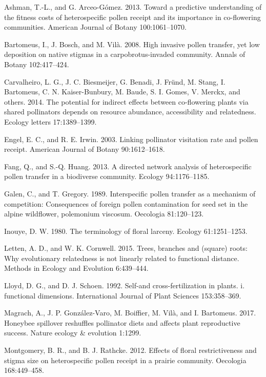 \documentclass[11pt,a4paper]{article}
\begin{document}
\hypertarget{ref-ashman2013}{}
Ashman, T.-L., and G. Arceo-Gómez. 2013. Toward a predictive
understanding of the fitness costs of heterospecific pollen receipt and
its importance in co-flowering communities. American Journal of Botany
100:1061--1070.

\hypertarget{ref-bartomeus2008}{}
Bartomeus, I., J. Bosch, and M. Vilà. 2008. High invasive pollen
transfer, yet low deposition on native stigmas in a carpobrotus-invaded
community. Annals of Botany 102:417--424.

\hypertarget{ref-carvalheiro2014}{}
Carvalheiro, L. G., J. C. Biesmeijer, G. Benadi, J. Fründ, M. Stang, I.
Bartomeus, C. N. Kaiser-Bunbury, M. Baude, S. I. Gomes, V. Merckx, and
others. 2014. The potential for indirect effects between co-flowering
plants via shared pollinators depends on resource abundance,
accessibility and relatedness. Ecology letters 17:1389--1399.

\hypertarget{ref-engel2003}{}
Engel, E. C., and R. E. Irwin. 2003. Linking pollinator visitation rate
and pollen receipt. American Journal of Botany 90:1612--1618.

\hypertarget{ref-fang2013}{}
Fang, Q., and S.-Q. Huang. 2013. A directed network analysis of
heterospecific pollen transfer in a biodiverse community. Ecology
94:1176--1185.

\hypertarget{ref-galen1989}{}
Galen, C., and T. Gregory. 1989. Interspecific pollen transfer as a
mechanism of competition: Consequences of foreign pollen contamination
for seed set in the alpine wildflower, polemonium viscosum. Oecologia
81:120--123.

\hypertarget{ref-inouye1980}{}
Inouye, D. W. 1980. The terminology of floral larceny. Ecology
61:1251--1253.

\hypertarget{ref-letten2015}{}
Letten, A. D., and W. K. Cornwell. 2015. Trees, branches and (square)
roots: Why evolutionary relatedness is not linearly related to
functional distance. Methods in Ecology and Evolution 6:439--444.

\hypertarget{ref-lloyd1992}{}
Lloyd, D. G., and D. J. Schoen. 1992. Self-and cross-fertilization in
plants. i. functional dimensions. International Journal of Plant
Sciences 153:358--369.

\hypertarget{ref-magrach2017}{}
Magrach, A., J. P. González-Varo, M. Boiffier, M. Vilà, and I.
Bartomeus. 2017. Honeybee spillover reshuffles pollinator diets and
affects plant reproductive success. Nature ecology \& evolution 1:1299.

\hypertarget{ref-montgomery2012}{}
Montgomery, B. R., and B. J. Rathcke. 2012. Effects of floral
restrictiveness and stigma size on heterospecific pollen receipt in a
prairie community. Oecologia 168:449--458.
\end{document}
